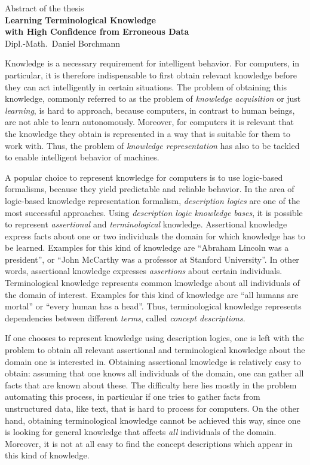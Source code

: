 \documentclass[english,fleqn]{scrartcl}
\begin{document}
\medskip
\begin{center}
  \normalsize Abstract of the thesis\\
  \LARGE\textbf{Learning Terminological Knowledge\\ with High Confidence from Erroneous
    Data}\\
  \bigskip%
  \large Dipl.-Math.\ Daniel Borchmann
\end{center}
\bigskip
\bigskip

\noindent
Knowledge is a necessary requirement for intelligent behavior.  For computers, in
particular, it is therefore indispensable to first obtain relevant knowledge before they
can act intelligently in certain situations.  The problem of obtaining this knowledge,
commonly referred to as the problem of \emph{knowledge acquisition} or just
\emph{learning}, is hard to approach, because computers, in contrast to human beings, are
not able to learn autonomously.  Moreover, for computers it is relevant that the knowledge
they obtain is represented in a way that is suitable for them to work with.  Thus, the
problem of \emph{knowledge representation} has also to be tackled to enable intelligent
behavior of machines.

A popular choice to represent knowledge for computers is to use logic-based formalisms,
because they yield predictable and reliable behavior.  In the area of logic-based
knowledge representation formalism, \emph{description logics} are one of the most
successful approaches.  Using \emph{description logic knowledge bases}, it is possible to
represent \emph{assertional} and \emph{terminological} knowledge.  Assertional knowledge
express facts about one or two individuals the domain for which knowledge has to be
learned.  Examples for this kind of knowledge are \enquote{Abraham Lincoln was a
  president}, or \enquote{John McCarthy was a professor at Stanford University}.  In other
words, assertional knowledge expresses \emph{assertions} about certain individuals.
Terminological knowledge represents common knowledge about all individuals of the domain
of interest.  Examples for this kind of knowledge are \enquote{all humans are mortal} or
\enquote{every human has a head}.  Thus, terminological knowledge represents dependencies
between different \emph{terms}, called \emph{concept descriptions}.

If one chooses to represent knowledge using description logics, one is left with the
problem to obtain all relevant assertional and terminological knowledge about the domain
one is interested in.  Obtaining assertional knowledge is relatively easy to obtain:
assuming that one knows all individuals of the domain, one can gather all facts that are
known about these.  The difficulty here lies mostly in the problem automating this
process, in particular if one tries to gather facts from unstructured data, like text,
that is hard to process for computers.  On the other hand, obtaining terminological
knowledge cannot be achieved this way, since one is looking for general knowledge that
affects \emph{all} individuals of the domain.  Moreover, it is not at all easy to find the
concept descriptions which appear in this kind of knowledge.
\end{document}
